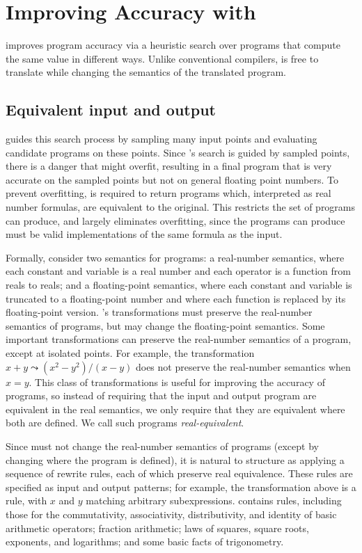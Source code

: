 \documentclass[paper.tex]{subfiles}
\begin{document}
\section{Improving Accuracy with  \casio}
\label{sec:synthesis}

\casio improves program accuracy via a heuristic search
  over programs that compute the same value in different ways.
Unlike conventional compilers, \casio is free
  to translate while changing the semantics of the translated program.

\subsection{Equivalent input and output}

\casio guides this search process by sampling many input points
  and evaluating candidate programs on these points.
Since \casio's search is guided by sampled points,
  there is a danger that \casio might overfit,
  resulting in a final program that is very accurate on the sampled points
  but not on general floating point numbers.
To prevent overfitting, \casio is required to return
  programs which, interpreted as real number formulas,
  are equivalent to the original.
This restricts the set of programs \casio can produce,
  and largely eliminates overfitting,
  since the programs \casio can produce must be valid implementations
  of the same formula as the input.

Formally, consider two semantics for programs:
  a real-number semantics,
  where each constant and variable is a real number
  and each operator is a function from reals to reals;
  and a floating-point semantics,
  where each constant and variable is truncated to a floating-point number
  and where each function is replaced by its floating-point version.
\casio's transformations must preserve the real-number semantics of programs,
  but may change the floating-point semantics.
Some important transformations
  can preserve the real-number semantics of a program,
  except at isolated points.
For example, the transformation $x + y \leadsto (x^2 - y^2)/(x - y)$
  does not preserve the real-number semantics when $x = y$.
This class of transformations is useful for improving the accuracy of programs,
  so instead of requiring that the input and output program
  are equivalent in the real semantics,
  we only require that they are equivalent where both are defined.
We call such programs \emph{real-equivalent}.

Since \casio must not change the real-number semantics of programs
  (except by changing where the program is defined),
  it is natural to structure \casio
  as applying a sequence of rewrite rules,
  each of which preserve real equivalence.
These rules are specified as input and output patterns;
  for example, the transformation above is a rule,
  with $x$ and $y$ matching arbitrary subexpressions.
\casio contains \nRewrites rules,
  including those for
  the commutativity, associativity, distributivity, and identity
  of basic arithmetic operators;
  fraction arithmetic;
  laws of squares, square roots, exponents, and logarithms;
  and some basic facts of trigonometry.
\end{document}
